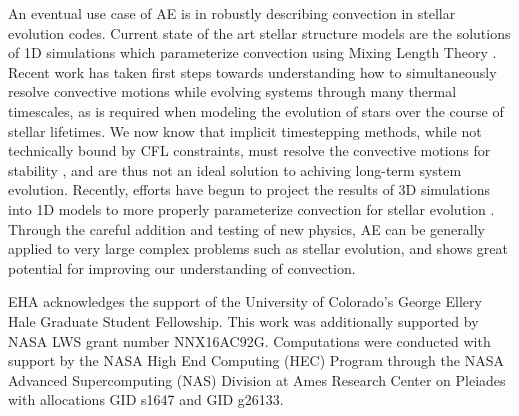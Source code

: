 \documentclass[aps, pre, onecolumn, nofootinbib, notitlepage, groupedaddress, amsfonts, amssymb, amsmath, longbibliography]{revtex4-1}
\begin{document}
An eventual use case of AE is in robustly describing convection
in stellar evolution codes. Current state of the art stellar structure
models are the solutions of 1D simulations which parameterize convection 
using Mixing Length Theory \cite{paxton&all2011}. Recent work has taken first steps towards
understanding how to simultaneously resolve convective motions while evolving
systems through many thermal timescales, as is required when modeling the evolution of stars
over the course of stellar lifetimes.
We now know that implicit timestepping methods, while not technically bound by
CFL constraints, must resolve the convective motions for stability
\cite{viallet&all2011, viallet&all2013, viallet&all2016}, and are thus
not an ideal solution to achiving long-term system evolution.
Recently, efforts have begun to project the results of 3D simulations into 1D
models to more properly parameterize convection for stellar evolution
\cite{arnett&all2015, cristini&all2016}.
Through the
careful addition and testing of new physics, AE can be generally applied to
very large complex problems such as stellar evolution, and
shows great potential for improving our understanding of convection.

\begin{acknowledgments}
EHA acknowledges the support of the University of Colorado's George 
Ellery Hale Graduate Student Fellowship.
This work was additionally supported by  NASA LWS grant number NNX16AC92G.  
Computations were conducted 
with support by the NASA High End Computing (HEC) Program through the NASA 
Advanced Supercomputing (NAS) Division at Ames Research Center on Pleiades
with allocations GID s1647 and GID g26133.
\end{acknowledgments}


\appendix
\end{document}
